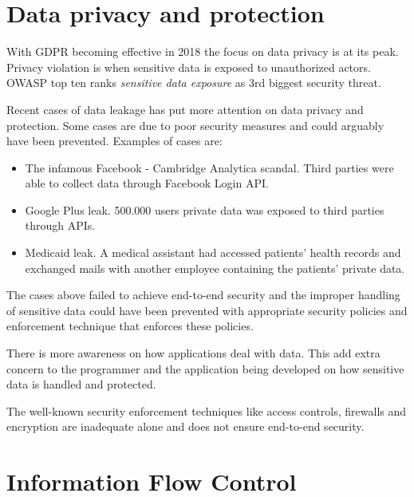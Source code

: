 \section{Data privacy and protection}

With GDPR becoming effective in 2018 the focus on data privacy is at its peak. 
Privacy violation is when sensitive data is exposed to unauthorized actors. OWASP top ten ranks \emph{sensitive data exposure} as 3rd biggest security threat. 

Recent cases of data leakage has put more attention on data privacy and protection. Some cases are due to poor security measures and could arguably have been prevented. Examples of cases are:

\begin{itemize}
	\item The infamous Facebook - Cambridge Analytica scandal. Third parties were able to collect data through Facebook Login API.
	\item Google Plus leak. 500.000 users private data was exposed to third parties through APIs.
	\item Medicaid leak. A medical assistant had accessed patients' health records and exchanged mails with another employee containing the patients' private data.  
\end{itemize}



The cases above failed to achieve end-to-end security and the improper handling of sensitive data could have been prevented with appropriate security policies and enforcement technique that enforces these policies.

There is more awareness on how applications deal with data. This add extra concern to the programmer and the application being developed on how sensitive data is handled and protected.  

The well-known security enforcement techniques like access controls, firewalls and encryption are inadequate alone and does not ensure end-to-end security.








\section{Information Flow Control} %

